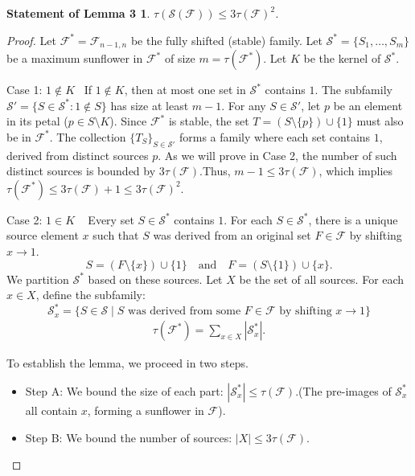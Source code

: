 \documentclass[runningheads,12pt,a4paper]{article}
\newtheorem*{statement3}{Statement of Lemma 3}
\begin{document}
	\begin{statement3} 
		$\tau(\mathcal{S}(\mathcal{F})) \leq 3\tau(\mathcal{F})^2$.
	\end{statement3}
	
	\begin{proof}
		Let $\mathcal{F}^* = \mathcal{F}_{n-1,n}$ be the fully shifted (stable) family. Let $\mathcal{S}^* = \{ S_1, \dots, S_m \}$ be a maximum sunflower in $\mathcal{F}^*$ of size $m = \tau(\mathcal{F}^*)$. Let $K$ be the kernel of $\mathcal{S}^*$.
		
		Case 1: $1 \notin K$~ If $1 \notin K$, then at most one set in $\mathcal{S}^*$ contains $1$. The subfamily $\mathcal{S}' = \{ S \in \mathcal{S}^* : 1 \notin S \}$ has size at least $m-1$. For any $S \in \mathcal{S}'$, let $p$ be an element in its petal ($p \in S \setminus K$). Since $\mathcal{F}^*$ is stable, the set $T = (S \setminus \{p\}) \cup \{1\}$ must also be in $\mathcal{F}^*$. The collection $\{ T_S \}_{S \in \mathcal{S}'}$ forms a family where each set contains $1$, derived from distinct sources $p$. As we will prove in Case 2, the number of such distinct sources is bounded by $3\tau(\mathcal{F})$.Thus, $m-1 \leq 3\tau(\mathcal{F})$, which implies $\tau(\mathcal{F}^*) \leq 3\tau(\mathcal{F}) + 1 \leq 3\tau(\mathcal{F})^2$.
		
		Case 2: $1 \in K$ ~ Every set $S \in \mathcal{S}^*$ contains $1$. For each $S \in \mathcal{S}^*$, there is a unique source element $x$ such that $S$ was derived from an original set $F \in \mathcal{F}$ by shifting $x \to 1$.
		$$S = (F \setminus \{x\}) \cup \{1\} \quad \text{and} \quad F = (S \setminus \{1\}) \cup \{x\}.$$
		We partition $\mathcal{S}^*$ based on these sources. Let $X$ be the set of all sources. 
		For each $x \in X$, define the subfamily:
		$$\mathcal{S}^*_x = \{ S \in \mathcal{S} \mid S \text{ was derived from some } F \in \mathcal{F} \text{ by shifting } x \to 1 \}$$
		\begin{align}\label{eq:todo}
			\tau(\mathcal{F}^*) = \sum_{x \in X} |\mathcal{S}^*_x|.
		\end{align}
		
		
		To establish the lemma, we proceed in two steps.
		\begin{itemize}
			\item Step A: We bound the size of each part: $|\mathcal{S}^*_x| \leq \tau(\mathcal{F})$.(The pre-images of $\mathcal{S}^*_x$ all contain $x$, forming a sunflower in $\mathcal{F}$).
			\item Step B: We bound the number of sources: $|X| \leq 3\tau(\mathcal{F})$.
		\end{itemize}
		

\end{proof}
\end{document}
